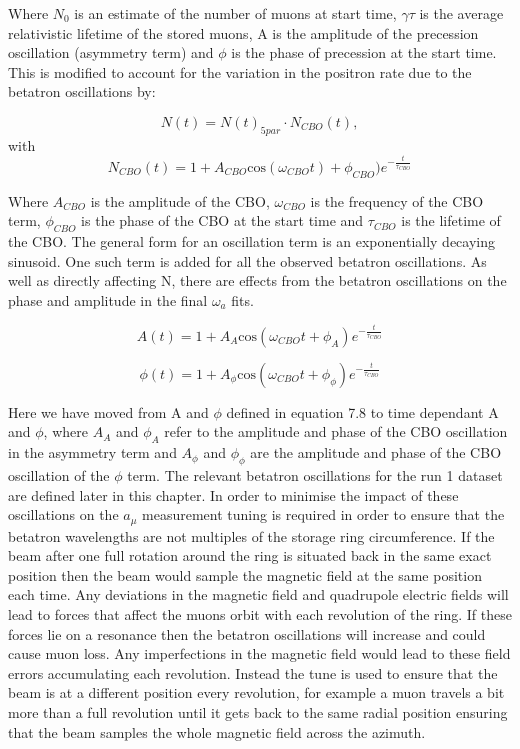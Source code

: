 \noindent 
Where $N_{0}$ is an estimate of the number of muons at start time, $\gamma\tau$ is the average relativistic lifetime of the stored muons, A is the amplitude of the precession oscillation (asymmetry term) and $\phi$ is the phase of precession at the start time. This is modified to account for the variation in the positron rate due to the betatron oscillations by:

\begin{equation}
N(t) = N(t)_{5par}\cdot{N_{CBO}}(t),
\end{equation}
\noindent
with
\begin{equation}
{N_{CBO}}(t) = 1 + A_{CBO}\mathrm{cos}(\omega_{CBO}t) + \phi_{CBO})e^{-\frac{t}{\tau_{CBO}}}
\end{equation}

\noindent
Where $A_{CBO}$ is the amplitude of the CBO, $\omega_{CBO}$ is the frequency of the CBO term, $\phi_{CBO}$ is the phase of the CBO at the start time and $\tau_{CBO}$ is the lifetime of the CBO. The general form for an oscillation term is an exponentially decaying sinusoid. One such term is added for all the observed betatron oscillations. As well as directly affecting N, there are effects from the betatron oscillations on the phase and amplitude in the final $\omega_{a}$ fits. 

\begin{equation}
{A}(t) = 1 + A_{A}\mathrm{cos}(\omega_{CBO}t + \phi_{A})e^{-{\frac{t}{\tau_{CBO}}}}
\end{equation}

\begin{equation}
{\phi}(t) = 1 + A_{\phi}\mathrm{cos}(\omega_{CBO}t + \phi_{\phi})e^{-{\frac{t}{\tau_{CBO}}}}
\end{equation}

\noindent
Here we have moved from A and $\phi$ defined in equation 7.8 to time dependant A and $\phi$, where $A_{A}$ and $\phi_{A}$ refer to the amplitude and phase of the CBO oscillation in the asymmetry term and $A_{\phi}$ and $\phi_{\phi}$ are the amplitude and phase of the CBO oscillation of the $\phi$ term. The relevant betatron oscillations for the run 1 dataset are defined later in this chapter. In order to minimise the impact of these oscillations on the $a_{\mu}$ measurement tuning is required in order to ensure that the betatron wavelengths are not multiples of the storage ring circumference. If the beam after one full rotation around the ring is situated back in the same exact position then the beam would sample the magnetic field at the same position each time. Any deviations in the magnetic field and quadrupole electric fields will lead to forces that affect the muons orbit with each revolution of the ring. If these forces lie on a resonance then the betatron oscillations will increase and could cause muon loss. Any imperfections in the magnetic field would lead to these field errors accumulating each revolution. Instead the tune is used to ensure that the beam is at a different position every revolution, for example a muon travels a bit more than a full revolution until it gets back to the same radial position ensuring that the beam samples the whole magnetic field across the azimuth. 

